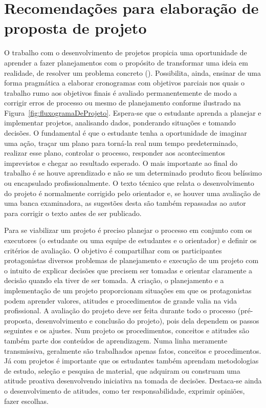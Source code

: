 \graphicspath{{figuras/}}



\chapter{Recomendações para elaboração de proposta de projeto}
\label{cap3}


O trabalho com o desenvolvimento de projetos propicia uma oportunidade de aprender a fazer planejamentos com o propósito de transformar uma ideia em realidade, de resolver um problema concreto (\cite{Signorelli2001}). Possibilita, ainda, ensinar de uma forma pragmática a elaborar cronogramas com objetivos parciais nos quais o trabalho rumo aos objetivos finais é avaliado permanentemente de modo a corrigir erros de processo ou mesmo de planejamento conforme ilustrado na Figura~\ref{fig:fluxogramaDeProjeto}. Espera-se que o estudante aprenda a planejar e implementar projetos, analisando dados, ponderando situações e tomando decisões. O fundamental é que o estudante tenha a oportunidade de imaginar uma ação, traçar um plano para torná-la real num tempo predeterminado, realizar esse plano, controlar o processo, responder aos acontecimentos imprevistos e chegar ao resultado esperado. O mais  importante ao final do trabalho é se houve aprendizado e não se um determinado produto ficou belíssimo ou encapsulado profissionalmente. O texto técnico que relata o desenvolvimento do projeto é normalmente corrigido pelo orientador e, se houver uma avaliação de uma banca examinadora, as sugestões desta são também repassadas ao autor para corrigir o texto antes de ser publicado. 

Para se viabilizar um projeto é preciso planejar o processo em conjunto com os executores (o estudante ou uma equipe de estudantes e o orientador) e definir os critérios de avaliação. O objetivo é compartilhar com os participantes protagonistas diversos problemas de planejamento e execução de um projeto com o intuito de explicar decisões que precisem ser tomadas e orientar claramente a decisão quando ela tiver de ser tomada. 
A criação, o planejamento e a implementação de um projeto proporcionam situações em que os protagonistas  podem aprender valores, atitudes e procedimentos de grande valia na vida profissional.
A avaliação do projeto deve ser feita durante todo o processo (pré-proposta, desenvolvimento e conclusão do projeto), pois dela dependem os passos seguintes e os ajustes. 
Num projeto os procedimentos, conceitos e atitudes são também parte dos conteúdos de aprendizagem. Numa linha meramente transmissiva, geralmente são trabalhados apenas fatos, conceitos e procedimentos. Já com projetos é importante que os estudantes também aprendam metodologias de estudo, seleção e pesquisa de material, que adquiram ou construam uma atitude proativa desenvolvendo iniciativa na tomada de decisões. Destaca-se ainda o desenvolvimento de atitudes, como ter responsabilidade, exprimir opiniões, fazer escolhas. 

